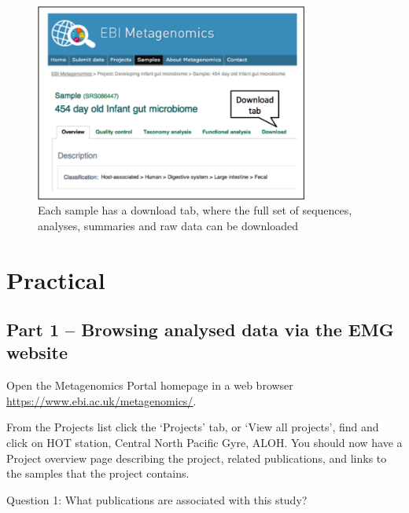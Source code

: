 \begin{figure}[H]
\centering
\includegraphics[width=0.8\textwidth]{handout/FA_DL.png}
\caption{Each sample has a download tab, where the full set of sequences, analyses, summaries and raw data can be downloaded}
\label{fig:FA_DL}
\end{figure}

\section{Practical}

\subsection{Part 1 – Browsing analysed data via the EMG website}

\begin{steps}
Open the Metagenomics Portal homepage in a web browser \url{https://www.ebi.ac.uk/metagenomics/}.

From the Projects list click the ‘Projects’ tab, or ‘View all projects’, find and click on HOT station, Central North Pacific Gyre, ALOH.
You should now have a Project overview page describing the project, related publications, and links to the samples that the project contains.
\end{steps}

\begin{questions}
Question 1: What publications are associated with this study?
\end{questions}

